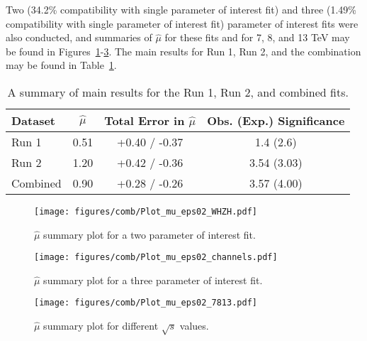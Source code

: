 Two (34.2\% compatibility with single parameter of interest fit) and three (1.49\% compatibility with single parameter of interest fit) parameter of interest fits were also conducted, and summaries of $\hat{\mu}$ for these fits and for 7, 8, and 13 TeV may be found in Figures~\ref{fig:combmushat1}-\ref{fig:combmushat3}.  The main results for Run 1, Run 2, and the combination may be found in Table~\ref{tableCombresykts}.

\begin{table}[!htbp]
\begin{center}
\begin{tabular}{lccc} \hline\hline
Dataset & $\hat{\mu}$ & Total Error in $\hat{\mu}$ & Obs. (Exp.) Significance \\
\hline
Run 1 & 0.51 & +0.40 / -0.37 & 1.4 (2.6)\\
Run 2 & 1.20 & +0.42 / -0.36 & 3.54 (3.03)\\
Combined & 0.90 & +0.28 / -0.26 & 3.57 (4.00)\\
\hline\hline
\end{tabular}
\caption{A summary of main results for the Run 1, Run 2, and combined fits.}
\label{tableCombresykts}
\end{center}
\end{table}


\begin{figure}[!htbp]\captionsetup{justification=centering}
  \begin{center}
  \texttt{[image: figures/comb/Plot\_mu\_eps02\_WHZH.pdf]}
  \caption{$\hat{\mu}$ summary plot for a two parameter of interest fit.}
  \label{fig:combmushat1}
  \end{center}
\end{figure}
\begin{figure}[!htbp]\captionsetup{justification=centering}
  \begin{center}
  \texttt{[image: figures/comb/Plot\_mu\_eps02\_channels.pdf]}
  \caption{$\hat{\mu}$ summary plot for a three parameter of interest fit.}
  \label{fig:combmushat2}
  \end{center}
\end{figure}
\begin{figure}[!htbp]\captionsetup{justification=centering}
  \begin{center}
  \texttt{[image: figures/comb/Plot\_mu\_eps02\_7813.pdf]}
  \caption{$\hat{\mu}$ summary plot for different $\sqrt{s}$ values.}
  \label{fig:combmushat3}
  \end{center}
\end{figure}





